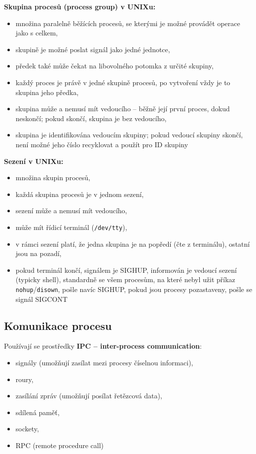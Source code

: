 \documentclass[a4paper, 11pt]{article}
\newcommand{\tcmd}[1]{\texttt{#1}}
\newcommand{\lpath}[1]{\texttt{#1}}
\begin{document}
\textbf{Skupina procesů (process group) v UNIXu:}
\begin{itemize}
    \item množina paralelně běžících procesů, se kterými je možné provádět operace jako s celkem,
    \item skupině je možné poslat signál jako jedné jednotce,
    \item předek také může čekat na libovolného potomka z určité skupiny,
    \item každý proces je právě v jedné skupině procesů, po vytvoření vždy je to skupina jeho předka,
    \item skupina může a nemusí mít vedoucího -- běžně její první proces, dokud neskončí; pokud skončí, skupina je bez vedoucího,
    \item skupina je identifikována vedoucím skupiny; pokud vedoucí skupiny skončí, není možné jeho číslo recyklovat a použít pro ID skupiny
\end{itemize}
 
\textbf{Sezení v UNIXu:}
\begin{itemize}
    \item množina skupin procesů,
    \item každá skupina procesů je v jednom sezení,
    \item sezení může a nemusí mít vedoucího,
    \item může mít řídicí terminál (\lpath{/dev/tty}),
    \item v rámci sezení platí, že jedna skupina je na popředí (čte z terminálu), ostatní jsou na pozadí,
    \item pokud terminál končí, signálem je SIGHUP, informován je vedoucí sezení (typicky shell), standardně se všem procesům, na které nebyl užit příkaz \tcmd{nohup}/\tcmd{disown}, pošle navíc SIGHUP, pokud jsou procesy pozastaveny, pošle se signál SIGCONT
\end{itemize}

\subsection{Komunikace procesu}
Používají se prostředky \textbf{IPC -- inter-process communication}:
\begin{itemize}
    \item signály (umožňují zasílat mezi procesy číselnou informaci),
    \item roury,
    \item zasílání zpráv (umožňují posílat řetězcová data),
    \item sdílená paměť,
    \item sockety,
    \item RPC (remote procedure call)
\end{itemize}
\end{document}

